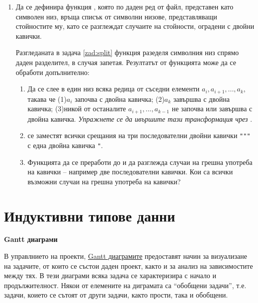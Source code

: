 \begin{enumerate}[resume]

	\item Да се дефинира функция , която по даден ред от  файл, представен като символен низ, връща списък от символни низове, представляващи стойностите му, като се разглеждат случаите на стойности, оградени с двойни кавички.

	Разгледаната в задача \ref{zad:split} функция  разеделя символния низ спрямо даден разделител, в случая запетая. Резултатът от функцията може да се обработи допълнително:
	\begin{enumerate}[label=\alph*)]
		\item Да се слее в един низ всяка редица от съседни елементи $a_i,a_{i+1},...,a_k$, такава че (1)$a_i$ започва с двойна кавичка;  (2)$a_k$ завършва с двойна кавичка; (3)никой от останалите $a_{i+1},...,a_{k-1}$ не започва или завършва с двойна кавичка. \emph{Упражнете се да ивършите тази трансформация чрез }.
		\item се заместят всички срещания на три последователни двойни кавички \verb#"""# с една двойна кавичка \verb#"#.
		\item Функцията да се преработи до  и да разглежда случаи на грешна употреба на кавички -- например две последователни кавички. Кои са всички възможни случаи на грешна употреба на кавички?
	\end{enumerate}

\end{enumerate}


\section {Индуктивни типове данни}


\begin{mdframed}[hidealllines=true,backgroundcolor=gray!20]
\textbf{Gantt диаграми}

В управлнието на проекти, \href{https://en.wikipedia.org/wiki/Gantt_chart}{Gantt диаграмите} предоставят начин за визуализане на задачите, от които се състои даден проект, както и за анализ на зависимостите между тях. В тези диаграми всяка задача се характеризира с начало и продължителност. Някои от елемените на диграмата са ``обобщени задачи'', т.е. задачи, коието се сътоят от други задачи, както прости, така и обобщени.
\end{mdframed}

